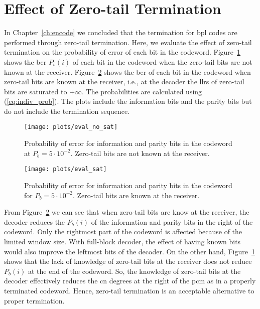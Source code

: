 \section{Effect of Zero-tail Termination}
In Chapter~\ref{ch:encode} we concluded that the termination for \gls{bpl} codes are performed through zero-tail termination. Here, we evaluate the effect of zero-tail termination on the probability of error of each bit in the codeword. Figure~\ref{fig:eval_no_sat} shows the \gls{ber} $P_b(i)$ of each bit in the codeword when the zero-tail bits are not known at the receiver. Figure~\ref{fig:eval_sat} shows the \gls{ber} of each bit in the codeword when zero-tail bits are known at the receiver, i.e., at the decoder the \glspl{llr} of zero-tail bits are saturated to $+\infty$. The probabilities are calculated using (\ref{eq:indiv_prob}).  The plots include the information bits and the parity bits but do not include the termination sequence.
\begin{figure}[htbp]
  \centering
  \texttt{[image: plots/eval\_no\_sat]}
  \caption[$P_b(i)$ when zero-tail bits are not known at receiver.]{Probability of error for information and parity bits in the codeword at $P_b=5\cdot 10^{-2}$. Zero-tail bits are not known at the receiver.}
  \label{fig:eval_no_sat}
\end{figure}

\begin{figure}[htbp]
  \centering
  \texttt{[image: plots/eval\_sat]}
  \caption[$P_b(i)$ when zero-tail bits are known at receiver.]{Probability of error for information and parity bits in the codeword for $P_b=5\cdot 10^{-2}$. Zero-tail bits are known at the receiver.}
  \label{fig:eval_sat}
\end{figure}
 
From Figure~\ref{fig:eval_sat} we can see that when zero-tail bits are know at the receiver, the decoder reduces the $P_b(i)$ of the information and parity bits in the right of the codeword. Only the rightmost part of the codeword is affected because of the limited window size. With full-block decoder, the effect of having known bits would also improve the leftmost bits of the decoder. On the other hand, Figure~\ref{fig:eval_no_sat} shows that the lack of knowledge of zero-tail bits at the receiver does not reduce $P_b(i)$ at the end of the codeword. So, the knowledge of zero-tail bits at the decoder effectively reduces the \gls{cn} degrees at the right of the \gls{pcm} as in a properly terminated codeword. Hence, zero-tail termination is an acceptable alternative to proper termination.
 
